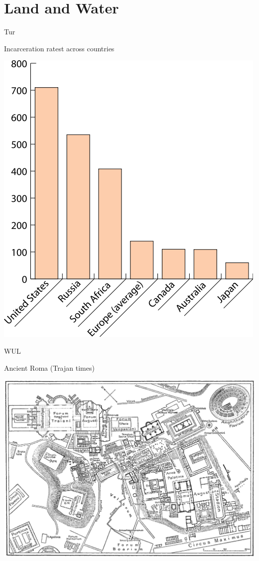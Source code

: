 \documentclass[print,Draft]{faosyb}
\begin{document}
\section{Land and Water}


\lipsum[1-4]

\begin{chart}{T}{ur}
\caption{Incarceration ratest across countries}
\label{chart:incarceration}
\includegraphics[width=\chartwidth,height=\chartheight]{incarceration}  
\end{chart}

\begin{map}{W}{UL}
\caption{Ancient Roma  (Trajan times)}
\label{map:roma}
\includegraphics[width=\chartwidth,height=\chartheight]{Rome}
\end{map}
\end{document}
